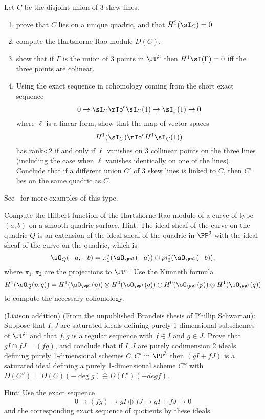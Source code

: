 \begin{exercise}
Let $C$ be the disjoint union of 3 skew lines. 
\begin{enumerate}
 \item prove that $C$ lies on a unique quadric, and that $H^2(\sI_C) = 0$
 \item compute the Hartshorne-Rao module $D(C)$.
 \item show that if $\Gamma$ is the union of 3 points in $\PP^3$ then
 $H^1\sI(\Gamma) = 0$ iff the three points are colinear.
 \item Using the exact sequence in cohomology coming from the short exact sequence
$$
0\to \sI_C \rTo^{\ell} \sI_C(1) \to \sI_\Gamma(1) \to 0
$$
where $\ell$ is a linear form, show that the map of vector spaces
$$
H^1(\sI_C) \rTo^{\ell} H^1\sI_C(1))
$$
has rank<2 if and only if $\ell$ vanishes on 3 collinear points on the three lines (including the case when $\ell$ vanishes identically on one of the lines).
Conclude that if a different union $C'$ of 3 skew lines is linked to $C$, then $C'$ lies on the same quadric as $C$.
\end{enumerate}
See~\cite{Migliore} for more examples of this type.
\end{exercise}

\begin{exercise}
 Compute the Hilbert function of the Hartshorne-Rao module of a curve of type $(a,b)$ on a smooth quadric surface.
 Hint: The ideal sheaf of the curve on the quadric $Q$ is an extension of the ideal sheaf of the quadric in $\PP^3$
 with the ideal sheaf of the curve on the quadric, which is 
 $$
 \sO_Q(-a,-b) = \pi_1^*(\sO_{\PP^1}(-a)) \otimes pi_2^*(\sO_{\PP^1}(-b)),
 $$
 where $\pi_1, \pi_2$ are the projections to $\PP^1$. Use the K\"unneth formula
 $$
 H^1(\sO_Q(p,q)) = H^1(\sO_{\PP^1}(p)) \otimes H^0(\sO_{\PP^1}(q)) \oplus
  H^0(\sO_{\PP^1}(p)) \otimes H^1(\sO_{\PP^1}(q))
 $$
  to compute the necessary cohomology.
\end{exercise}

\begin{exercise} (Liaison addition)\label{Liaison addition}
(From the unpublished Brandeis thesis of Phillip Schwartau):
Suppose that $I, J$ are saturated ideals defining purely 1-dimensional subschemes of $\PP^3$
and that $f,g$ is a regular sequence with $f\in I$ and $g\in J$.
Prove that $g I \cap fJ = (fg)$, and conclude that if $I,J$ are purely codimension 2 ideals
 defining purely 1-dimensional schemes $C,C'$ in $\PP^3$
 then  $(gI+fJ)$ is a saturated ideal defining a purely 1-dimensional
scheme $C''$ with $D(C'') = D(C)(-\deg g) \oplus D(C')(-deg f)$.

Hint: Use the exact sequence 
$$
0\to (fg) \to gI \oplus fJ \to gI+fJ \to 0
$$
and the corresponding exact sequence of quotients by these ideals.
\end{exercise}


